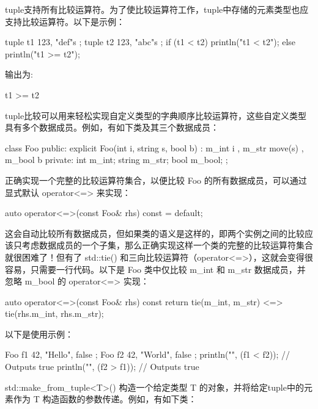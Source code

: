 
tuple支持所有比较运算符。为了使比较运算符工作，tuple中存储的元素类型也应支持比较运算符。以下是示例：

\begin{cpp}
tuple t1 { 123, "def"s };
tuple t2 { 123, "abc"s };
if (t1 < t2) { println("t1 < t2"); }
else { println("t1 >= t2"); }
\end{cpp}

输出为:

\begin{shell}
t1 >= t2
\end{shell}

tuple比较可以用来轻松实现自定义类型的字典顺序比较运算符，这些自定义类型具有多个数据成员。例如，有如下类及其三个数据成员：

\begin{cpp}
class Foo
{
    public:
        explicit Foo(int i, string s, bool b)
            : m_int { i }, m_str { move(s) }, m_bool { b } { }
    private:
        int m_int;
        string m_str;
        bool m_bool;
};
\end{cpp}

正确实现一个完整的比较运算符集合，以便比较 Foo 的所有数据成员，可以通过显式默认 operator<=> 来实现：

\begin{cpp}
auto operator<=>(const Foo& rhs) const = default;
\end{cpp}

这会自动比较所有数据成员，但如果类的语义是这样的，即两个实例之间的比较应该只考虑数据成员的一个子集，那么正确实现这样一个类的完整的比较运算符集合就很困难了！但有了 std::tie() 和三向比较运算符（operator<=>），这就会变得很容易，只需要一行代码。以下是 Foo 类中仅比较 m\_int 和 m\_str 数据成员，并忽略 m\_bool 的 operator<=> 实现：

\begin{cpp}
auto operator<=>(const Foo& rhs) const
{
    return tie(m_int, m_str) <=> tie(rhs.m_int, rhs.m_str);
}
\end{cpp}

以下是使用示例：

\begin{cpp}
Foo f1 { 42, "Hello", false };
Foo f2 { 42, "World", false };
println("{}", (f1 < f2)); // Outputs true
println("{}", (f2 > f1)); // Outputs true
\end{cpp}


std::make\_from\_tuple<T>() 构造一个给定类型 T 的对象，并将给定tuple中的元素作为 T 构造函数的参数传递。例如，有如下类：

